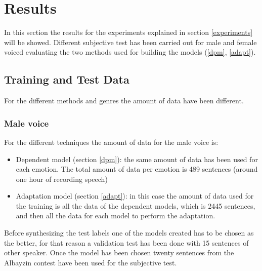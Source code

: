 \section{Results}\label{results}
In this section the results for the experiments explained in section \ref{experiments} will be showed. Different subjective test has been carried out for male and female voiced evaluating the two methods used for building the models (\ref{dpm}, \ref{adapt}).\\
\subsection{Training and Test Data}\label{ttd}
For the different methods and genres the amount of data have been different.
\subsubsection{Male voice}
For the different techniques the amount of data for the male voice is:
\begin{itemize}
	\item Dependent model (section \ref{dpm}): the same amount of data has been used for each emotion. The total amount of data per emotion is 489 sentences (around one hour of recording speech)
	\item Adaptation model (section \ref{adapt}): in this case the amount of data used for the training is all the data of the dependent models, which is 2445 sentences, and then all the data for each model to perform the adaptation.
\end{itemize}
Before synthesizing the test labels one of the models created has to be chosen as the better, for that reason a validation test has been done with 15 sentences of other speaker. Once the model has been chosen twenty sentences from the Albayzin contest have been used for the subjective test.
